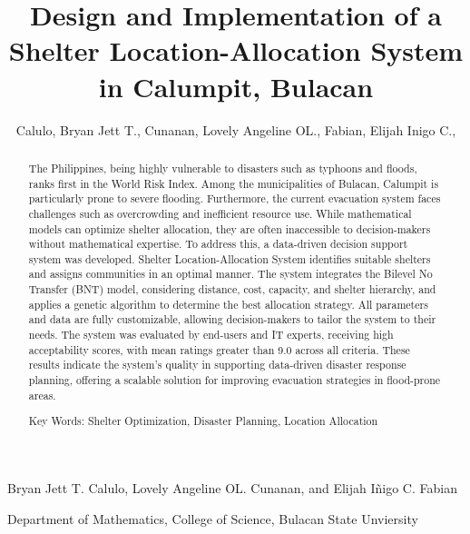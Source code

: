 \documentclass[11pt,letterpaper,]{article}
\title{Design and Implementation of a Shelter Location-Allocation System in Calumpit, Bulacan}
\author{Calulo, Bryan Jett T., Cunanan, Lovely Angeline OL., Fabian, Elijah Inigo C.,}
\begin{document}
{
	
	\vspace{6pt}
	
	Bryan Jett T. Calulo, Lovely Angeline OL. Cunanan, and Elijah Iñigo C. Fabian
	
	\vspace{6pt}
	
	Department of Mathematics, College of Science, Bulacan State Unviersity
	
\par}


\begin{abstract}
	The Philippines, being highly vulnerable to disasters such as typhoons and floods, ranks first in the World Risk Index. Among the municipalities of Bulacan, Calumpit is particularly prone to severe flooding. Furthermore, the current evacuation system faces challenges such as overcrowding and inefficient resource use. While mathematical models can optimize shelter allocation, they are often inaccessible to decision-makers without mathematical expertise. To address this, a data-driven decision support system was developed. Shelter Location-Allocation System identifies suitable shelters and assigns communities in an optimal manner. The system integrates the Bilevel No Transfer (BNT) model, considering distance, cost, capacity, and shelter hierarchy, and applies a genetic algorithm to determine the best allocation strategy. All parameters and data are fully customizable, allowing decision-makers to tailor the system to their needs. The system was evaluated by end-users and IT experts, receiving high acceptability scores, with mean ratings greater than 9.0 across all criteria. These results indicate the system’s quality in supporting data-driven disaster response planning, offering a scalable solution for improving evacuation strategies in flood-prone areas.
	
	\vspace{6pt}
	\noindent Key Words: \normalfont Shelter Optimization, Disaster Planning, Location Allocation
\end{abstract}

\onehalfspacing
\end{document}
